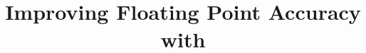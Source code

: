 \documentclass[pageno]{jpaper}
\begin{document}
\title{Improving Floating Point Accuracy with \casio}
\date{}
\maketitle
\thispagestyle{empty}



















\end{document}
